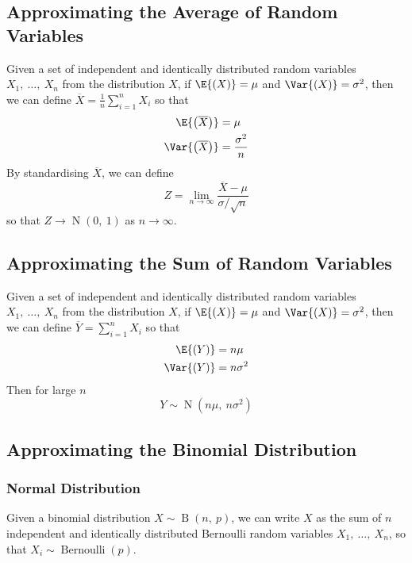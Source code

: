 \documentclass{article}
\begin{document}
\begin{multicols}{3}
    \subsection{Approximating the Average of Random Variables}
    Given a set of independent and identically distributed random variables \(X_1,\: \ldots,\: X_n\) from the distribution \(X\),
    if \(\E{\left( X \right)} = \mu\) and \(\Var{\left( X \right)} = \sigma^2\), then we can define \(\overline{X} = \frac{1}{n} \sum_{i = 1}^n X_i\)
    so that
    \begin{align*}
        \E{\left( \overline{X} \right)}   & = \mu                \\
        \Var{\left( \overline{X} \right)} & = \frac{\sigma^2}{n}
    \end{align*}
    By standardising \(\overline{X}\), we can define
    \begin{equation*}
        Z = \lim_{n \to \infty} \frac{\overline{X} - \mu}{\sigma / \sqrt{n}}
    \end{equation*}
    so that \(Z \to \operatorname{N}{\left( 0,\: 1 \right)}\) as \(n \to \infty\).
    \subsection{Approximating the Sum of Random Variables}
    Given a set of independent and identically distributed random variables \(X_1,\: \ldots,\: X_n\) from the distribution \(X\),
    if \(\E{\left( X \right)} = \mu\) and \(\Var{\left( X \right)} = \sigma^2\), then we can define \(\overline{Y} = \sum_{i = 1}^n X_i\)
    so that
    \begin{align*}
        \E{\left( Y \right)}   & = n \mu      \\
        \Var{\left( Y \right)} & = n \sigma^2
    \end{align*}
    Then for large \(n\)
    \begin{equation*}
        Y \sim \operatorname{N}{\left( n \mu,\: n \sigma^2 \right)}
    \end{equation*}
    \subsection{Approximating the Binomial Distribution}
    \subsubsection{Normal Distribution}
    Given a binomial distribution \(X \sim \operatorname{B}{\left( n,\: p \right)}\), we can write \(X\)
    as the sum of \(n\) independent and identically distributed Bernoulli random variables
    \(X_1,\: \ldots,\: X_n\), so that \(X_i \sim \operatorname{Bernoulli}{\left( p \right)}\).


\end{multicols}
\end{document}
